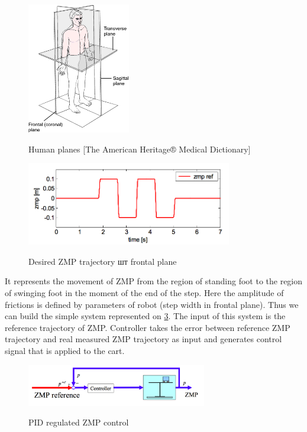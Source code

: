 \documentclass[12pt,a4paper]{report}
\begin{document}
		\begin{figure}[h!]
			\vspace{-0.2cm}
			\centering
			{\includegraphics[width=0.4\textwidth]{7}}
			\caption{Human planes [The American Heritage® Medical Dictionary]}
			\label{fig:7}
			\vspace{-0.1cm}
		\end{figure}
		\begin{figure}[h!]
			\vspace{-0.2cm}
			\centering
			{\includegraphics[width=0.8\textwidth]{8}}
			\caption{Desired ZMP trajectory шт frontal plane \cite{kajita2003biped}}
			\label{fig:8}
			\vspace{-0.1cm}
		\end{figure}
		It represents the movement of ZMP from the region of standing foot to the region of swinging foot in the moment of the end of the step. Here the amplitude of frictions is defined by parameters of robot (step width in frontal plane). Thus we can build the simple system represented on \cref{fig:9}. The input of this system is the reference trajectory of ZMP. Controller takes the error between reference ZMP trajectory and real measured ZMP trajectory as input and generates control signal that is applied to the cart. 
		\begin{figure}[h!]
			\vspace{-0.2cm}
			\centering
			{\includegraphics[width=0.7\textwidth]{9}}
			\caption{PID regulated ZMP control \cite{kajita2003biped}}
			\label{fig:9}
			\vspace{-0.1cm}
		\end{figure}
\end{document}
